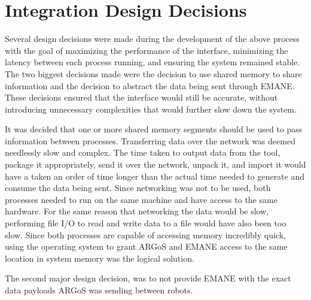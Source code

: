 \section{Integration Design Decisions}
Several design decisions were made during the development of the above process with the goal of maximizing the performance of the interface, minimizing the latency between each process running, and ensuring the system remained stable.
The two biggest decisions made were the decision to use shared memory to share information and the decision to abstract the data being sent through EMANE.
These decisions ensured that the interface would still be accurate, without introducing unnecessary complexities that would further slow down the system.\par 
It was decided that one or more shared memory segments should be used to pass information between processes.
Transferring data over the network was deemed needlessly slow and complex.
The time taken to output data from the tool, package it appropriately, send it over the network, unpack it, and import it would have a taken an order of time longer than the actual time needed to generate and consume the data being sent.
Since networking was not to be used, both processes needed to run on the same machine and have access to the same hardware.
For the same reason that networking the data would be slow, performing file I/O to read and write data to a file would have also been too slow.
Since both processes are capable of accessing memory incredibly quick, using the operating system to grant ARGoS and EMANE access to the same location in system memory was the logical solution.\par
The second major design decision, was to not provide EMANE with the exact data payloads ARGoS was sending between robots.
